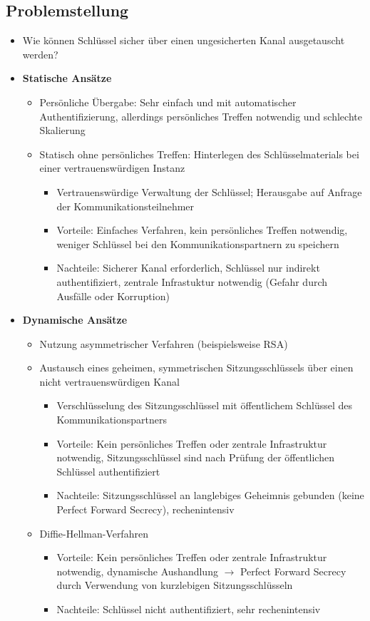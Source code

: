 \subsection{Problemstellung}
\begin{itemize}
	\item Wie können Schlüssel sicher über einen ungesicherten Kanal ausgetauscht werden?
	\item \textbf{Statische Ansätze}
	\begin{itemize}
		\item Persönliche Übergabe: Sehr einfach und mit automatischer Authentifizierung, allerdings persönliches Treffen notwendig und schlechte Skalierung
		\item Statisch ohne persönliches Treffen: Hinterlegen des Schlüsselmaterials bei einer vertrauenswürdigen Instanz
		\begin{itemize}
			\item Vertrauenswürdige Verwaltung der Schlüssel; Herausgabe auf Anfrage der Kommunikationsteilnehmer
			\item Vorteile: Einfaches Verfahren, kein persönliches Treffen notwendig, weniger Schlüssel bei den Kommunikationspartnern zu speichern
			\item Nachteile: Sicherer Kanal erforderlich, Schlüssel nur indirekt authentifiziert, zentrale Infrastuktur notwendig (Gefahr durch Ausfälle oder Korruption)
		\end{itemize}
	\end{itemize}
	\item \textbf{Dynamische Ansätze}
	\begin{itemize}
		\item Nutzung asymmetrischer Verfahren (beispielsweise RSA)
		\item Austausch eines geheimen, symmetrischen Sitzungsschlüssels über einen nicht vertrauenswürdigen Kanal
		\begin{itemize}
			\item Verschlüsselung des Sitzungsschlüssel mit öffentlichem Schlüssel des Kommunikationspartners
			\item Vorteile: Kein persönliches Treffen oder zentrale Infrastruktur notwendig, Sitzungsschlüssel sind nach Prüfung der öffentlichen Schlüssel authentifiziert
			\item Nachteile: Sitzungsschlüssel an langlebiges Geheimnis gebunden (keine Perfect Forward Secrecy), rechenintensiv
		\end{itemize}
		\item Diffie-Hellman-Verfahren
		\begin{itemize}
			\item Vorteile: Kein persönliches Treffen oder zentrale Infrastruktur notwendig, dynamische Aushandlung \(\rightarrow\) Perfect Forward Secrecy durch Verwendung von kurzlebigen Sitzungsschlüsseln
			\item Nachteile: Schlüssel nicht authentifiziert, sehr rechenintensiv
		\end{itemize}
	\end{itemize}
\end{itemize}


